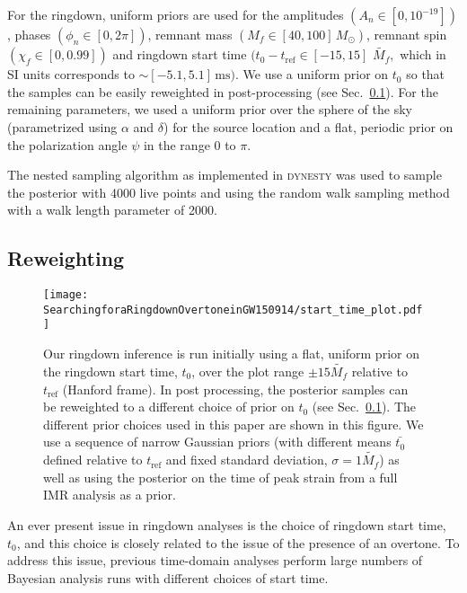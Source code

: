 For the ringdown, uniform priors are used for the amplitudes $(A_n \in [0,10^{-19}])$, phases $(\phi_n \in [0,2\pi])$, remnant mass $(M_f \in [40,100]\,M_\odot )$, remnant spin $(\chi_f \in [0,0.99])$ and ringdown start time $(t_0-t_\mathrm{ref} \in [-15, 15]\,\,\tilde{M_f},$ which in SI units corresponds to $\sim[-5.1,5.1]\, \mathrm{ms})$.
We use a uniform prior on $t_0$ so that the samples can be easily reweighted in post-processing (see Sec.~\ref{subsec:reweighting}). 
For the remaining parameters, we used a uniform prior over the sphere of the sky (parametrized using $\alpha$ and $\delta$) for the source location and a flat, periodic prior on the polarization angle $\psi$ in the range $0$ to $\pi$.

The nested sampling \cite{Skilling:2006gxv} algorithm as implemented in \textsc{dynesty} \cite{Speagle:2019ivv} was used to sample the posterior with 4000 live points and using the random walk sampling method with a walk length parameter of 2000.


\subsection{Reweighting} \label{subsec:reweighting}

\begin{figure}[t]
	\texttt{[image: SearchingforaRingdownOvertoneinGW150914/start\_time\_plot.pdf]}
	\caption[Different prior choices for the ringdown start time used for the GW150914 analysis]{ 
		Our ringdown inference is run initially using a flat, uniform prior on the ringdown start time, $t_0$, over the plot range $\pm 15 \tilde{M_f}$ relative to $t_\mathrm{ref}$ (Hanford frame).
		In post processing, the posterior samples can be reweighted to a different choice of prior on $t_0$ (see Sec.~\ref{subsec:reweighting}). 
		The different prior choices used in this paper are shown in this figure. 
		We use a sequence of narrow Gaussian priors (with different means $\bar{t_0}$ defined relative to $t_\mathrm{ref}$ and fixed standard deviation, $\sigma=1\tilde{M_f}$) as well as using the posterior on the time of peak strain from a full IMR analysis as a prior.
	}
	\label{fig:start_time}
\end{figure}

An ever present issue in ringdown analyses is the choice of ringdown start time, $t_0$, and this choice is closely related to the issue of the presence of an overtone.
To address this issue, previous time-domain analyses \cite{Isi:2019aib, Cotesta:2022pci, Isi:2022mhy} perform large numbers of Bayesian analysis runs with different choices of start time.

